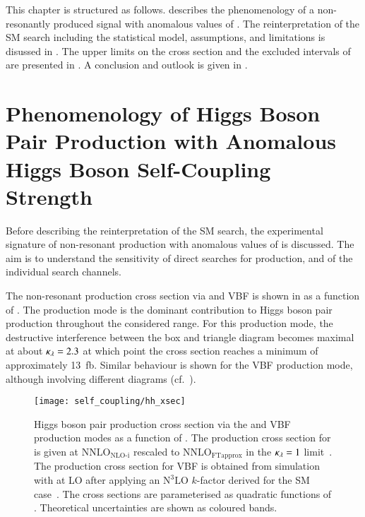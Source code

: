 This chapter is structured as follows. 
describes the phenomenology of a non-resonantly produced \HH signal
with anomalous values of \klambda. The reinterpretation of the SM \HH
search including the statistical model, assumptions, and limitations
is disussed in . The upper limits on the
cross section and the excluded intervals of \klambda are presented in
. A conclusion and outlook is given
in .


\section{Phenomenology of Higgs Boson Pair Production with Anomalous
  Higgs Boson Self-Coupling Strength}%
\label{sec:self_coupling_pheno}

Before describing the reinterpretation of the SM \HH search, the
experimental signature of non-resonant \HH production with anomalous
values of \klambda is discussed. The aim is to understand the
sensitivity of direct searches for \HH production, and of the
individual search channels.

The non-resonant \HH production cross section via \ggF and VBF is
shown in  as a function of \klambda. The \ggF
production mode is the dominant contribution to Higgs boson pair
production throughout the considered \klambda range. For this
production mode, the destructive interference between the box and
triangle diagram becomes maximal at about $\kappa_{\lambda} = 2.3$ at which
point the cross section reaches a minimum of approximately
\SI{13}{\femto\barn}. Similar behaviour is shown for the VBF
production mode, although involving different diagrams (cf.\
).

\begin{figure}[htbp]
  \centering

  \texttt{[image: self\_coupling/hh\_xsec]}

  \caption{Higgs boson pair production cross section via the \ggF and
    VBF production modes as a function of \klambda. The production
    cross section for \ggF is given at $\text{NNLO}_{\text{NLO-i}}$
    rescaled to $\text{NNLO}_{\text{FTapprox}}$ in the $\kappa_{\lambda} = 1$
    limit~\cite{Amoroso:2020lgh,Baglio:2020wgt,LHCHWGHH,Grazzini:2018bsd}. The
    production cross section for VBF is obtained from simulation with
    \MGNLO at LO after applying an $\text{N}^3\text{LO}$ $k$-factor
    derived for the SM case~\cite{Dreyer:2018qbw,LHCHWGHH}. The cross
    sections are parameterised as quadratic functions of
    \klambda. Theoretical uncertainties are shown as coloured bands.}%
  \label{fig:hh_xsec_incl}
\end{figure}

